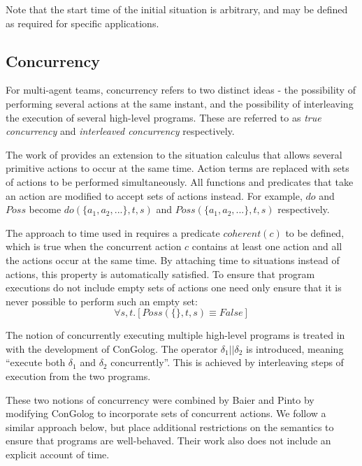 \documentclass[letterpaper]{article}
\begin{document}
Note that the start time of the initial situation is arbitrary, and
may be defined as required for specific applications.


\subsection{Concurrency}

\label{sub:Concurrency}

For multi-agent teams, concurrency refers to two distinct ideas -
the possibility of performing several actions at the same instant,
and the possibility of interleaving the execution of several high-level
programs. These are referred to as \emph{true concurrency} and \emph{interleaved
concurrency} respectively.

The work of \cite{lin92sc_conc,reiter96sc_nat_conc} provides an extension
to the situation calculus that allows several primitive actions to
occur at the same time. Action terms are replaced with sets of actions
to be performed simultaneously. All functions and predicates that
take an action are modified to accept sets of actions instead. For
example, $do$ and $Poss$ become $do(\{ a_{1},a_{2},...\},t,s)$
and $Poss(\{ a_{1},a_{2},...\},t,s)$ respectively.

The approach to time used in \cite{reiter96sc_nat_conc} requires
a predicate $coherent(c)$ to be defined, which is true when the concurrent
action $c$ contains at least one action and all the actions occur
at the same time. By attaching time to situations instead of actions,
this property is automatically satisfied. To ensure that program executions
do not include empty sets of actions one need only ensure that it
is never possible to perform such an empty set:
\begin{equation}
\forall s,t.\left[Poss(\{\},t,s)\equiv False\right]
\end{equation}


The notion of concurrently executing multiple high-level programs
is treated in \cite{giacomo00congolog} with the development of ConGolog.
The operator $\delta_{1}||\delta_{2}$ is introduced, meaning ``execute
both $\delta_{1}$ and $\delta_{2}$ concurrently''. This is achieved
by interleaving steps of execution from the two programs.

These two notions of concurrency were combined by Baier and Pinto
\cite{pinto99tcongolog} by modifying ConGolog to incorporate sets
of concurrent actions. We follow a similar approach below, but place
additional restrictions on the semantics to ensure that programs are
well-behaved. Their work also does not include an explicit account
of time.
\end{document}
